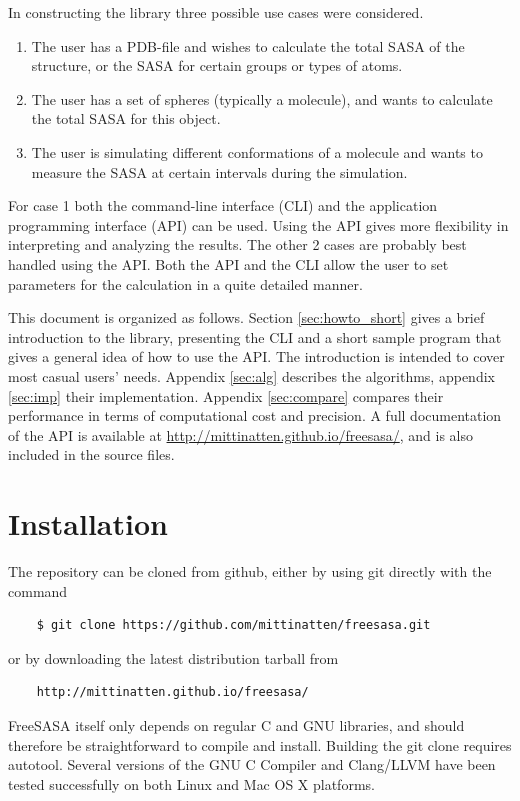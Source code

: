 \documentclass[a4paper,11pt]{article}
\begin{document}
In constructing the library three possible use cases were considered. 
\begin{enumerate}
\item The user has a PDB-file and wishes to calculate the total SASA of
  the structure, or the SASA for certain groups or types of atoms.
\item The user has a set of spheres (typically a molecule), and wants
  to calculate the total SASA for this object.
\item The user is simulating different conformations of a molecule and
  wants to measure the SASA at certain intervals during the simulation.
\end{enumerate}
For case 1 both the command-line interface (CLI) and the application
programming interface (API) can be used. Using the API gives more
flexibility in interpreting and analyzing the results. The other 2
cases are probably best handled using the API. Both the API and the
CLI allow the user to set parameters for the calculation in a quite
detailed manner.

This document is organized as follows. Section \ref{sec:howto_short}
gives a brief introduction to the library, presenting the CLI and a
short sample program that gives a general idea of how to use the
API. The introduction is intended to cover most casual users'
needs. Appendix \ref{sec:alg} describes the algorithms, appendix
\ref{sec:imp} their implementation. Appendix \ref{sec:compare}
compares their performance in terms of computational cost and
precision. A full documentation of the API is available at
\url{http://mittinatten.github.io/freesasa/}, and is also included in
the source files.

\section{Installation} \label{sec:installing}

The repository can be cloned from github, either by using git directly
with the command
\begin{verbatim}
    $ git clone https://github.com/mittinatten/freesasa.git
\end{verbatim}
or by downloading the latest distribution tarball from
\begin{verbatim}
    http://mittinatten.github.io/freesasa/
\end{verbatim}
FreeSASA itself only depends on regular C and GNU libraries, and
should therefore be straightforward to compile and install. Building
the git clone requires autotool.  Several versions of the GNU C
Compiler and Clang/LLVM have been tested successfully on both Linux
and Mac OS X platforms. 
\end{document}
